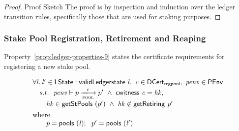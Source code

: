 \begin{proof}{Proof Sketch}
  The proof is by inspection and induction over the ledger transition rules, specifically those that are used for staking purposes.
\end{proof}


\subsubsection{Stake Pool Registration, Retirement and Reaping}
\label{sec:ledg-state-prop}

Property~\ref{prop:ledger-properties-9} states the certificate requirements for registering a new stake pool.

\begin{property}
  $$
  \begin{array}{l}
    \forall \var{l}, \var{l'} \in \ledgerState: \applyFun{validLedgerstate}{l},~\var{c} \in \DCertRegPool,~
    \var{penv} \in\PEnv \\[0.5ex]
    \quad s.t. ~~ \var{penv} \vdash p \trans{pool}{c} p'
   ~\wedge~  \applyFun{cwitness}{c} = \var{hk}, \\[1ex]
    \quad\quad\var{hk}\in \applyFun{getStPools}(p') ~\wedge~ \var{hk} \not\in \applyFun{getRetiring}{p'}\\[1ex]
    \mathrm{where}~~\\
    \quad\quad p = \applyFun{pools}(\var{l}); ~~p' = \applyFun{pools}(\var{l'})
  \end{array}
  $$
  \label{prop:ledger-properties-9}
\end{property}


